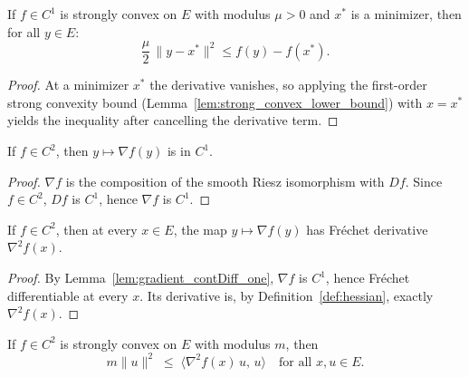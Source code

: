 \begin{lemma}\label{lem:quadratic_growth_at_minimizer}
  \leanok{}
  If $f\in C^1$ is strongly convex on $E$ with modulus $\mu>0$ and $x^*$ is a minimizer, then for all $y\in E$:
  \[
    \frac{\mu}{2}\,\|y-x^*\|^2 \le f(y)-f(x^*).
  \]
\end{lemma}
\begin{proof}
  \leanok{}
  At a minimizer $x^*$ the derivative vanishes, so applying the first-order strong convexity bound
  (Lemma~\ref{lem:strong_convex_lower_bound}) with $x=x^*$ yields the inequality after cancelling the derivative term.
\end{proof}


\begin{lemma}\label{lem:gradient_contDiff_one}
  \leanok{}
  \uses{}
  If $f \in C^2$, then $y \mapsto \nabla f(y)$ is in $C^1$.
\end{lemma}
\begin{proof}
  \leanok{}
  $\nabla f$ is the composition of the smooth Riesz isomorphism with $Df$. Since $f\in C^2$, $Df$
  is $C^1$, hence $\nabla f$ is $C^1$.
\end{proof}

\begin{lemma}\label{lem:hasFDerivAt_gradient}
  \leanok{}
  If $f \in C^2$, then at every $x \in E$, the map $y \mapsto \nabla f(y)$ has Fr\'echet
  derivative $\nabla^2 f(x)$.
\end{lemma}
\begin{proof}
  \leanok{}
  By Lemma~\ref{lem:gradient_contDiff_one}, $\nabla f$ is $C^1$, hence Fr\'echet differentiable at
  every $x$. Its derivative is, by Definition~\ref{def:hessian}, exactly $\nabla^2 f(x)$.
\end{proof}

\begin{lemma}\label{lem:strongConvexOn_imp_hessian_lb}
  \leanok{}
  If $f \in C^2$ is strongly convex on $E$ with modulus $m$, then
  \[
    m\|u\|^2 \;\le\; \langle \nabla^2 f(x)\, u,\, u\rangle \quad \text{for all } x, u \in E.
  \]
\end{lemma}

